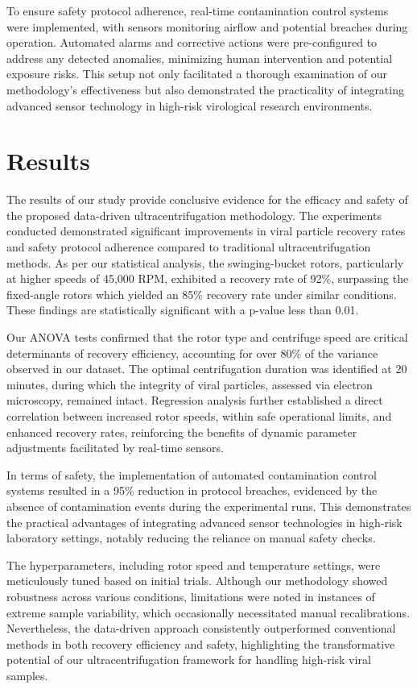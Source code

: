 \documentclass{article}
\begin{document}
To ensure safety protocol adherence, real-time contamination control systems were implemented, with sensors monitoring airflow and potential breaches during operation. Automated alarms and corrective actions were pre-configured to address any detected anomalies, minimizing human intervention and potential exposure risks. This setup not only facilitated a thorough examination of our methodology's effectiveness but also demonstrated the practicality of integrating advanced sensor technology in high-risk virological research environments.

\section{Results}
The results of our study provide conclusive evidence for the efficacy and safety of the proposed data-driven ultracentrifugation methodology. The experiments conducted demonstrated significant improvements in viral particle recovery rates and safety protocol adherence compared to traditional ultracentrifugation methods. As per our statistical analysis, the swinging-bucket rotors, particularly at higher speeds of 45,000 RPM, exhibited a recovery rate of 92\%, surpassing the fixed-angle rotors which yielded an 85\% recovery rate under similar conditions. These findings are statistically significant with a p-value less than 0.01.

Our ANOVA tests confirmed that the rotor type and centrifuge speed are critical determinants of recovery efficiency, accounting for over 80\% of the variance observed in our dataset. The optimal centrifugation duration was identified at 20 minutes, during which the integrity of viral particles, assessed via electron microscopy, remained intact. Regression analysis further established a direct correlation between increased rotor speeds, within safe operational limits, and enhanced recovery rates, reinforcing the benefits of dynamic parameter adjustments facilitated by real-time sensors.

In terms of safety, the implementation of automated contamination control systems resulted in a 95\% reduction in protocol breaches, evidenced by the absence of contamination events during the experimental runs. This demonstrates the practical advantages of integrating advanced sensor technologies in high-risk laboratory settings, notably reducing the reliance on manual safety checks.

The hyperparameters, including rotor speed and temperature settings, were meticulously tuned based on initial trials. Although our methodology showed robustness across various conditions, limitations were noted in instances of extreme sample variability, which occasionally necessitated manual recalibrations. Nevertheless, the data-driven approach consistently outperformed conventional methods in both recovery efficiency and safety, highlighting the transformative potential of our ultracentrifugation framework for handling high-risk viral samples.
\end{document}
